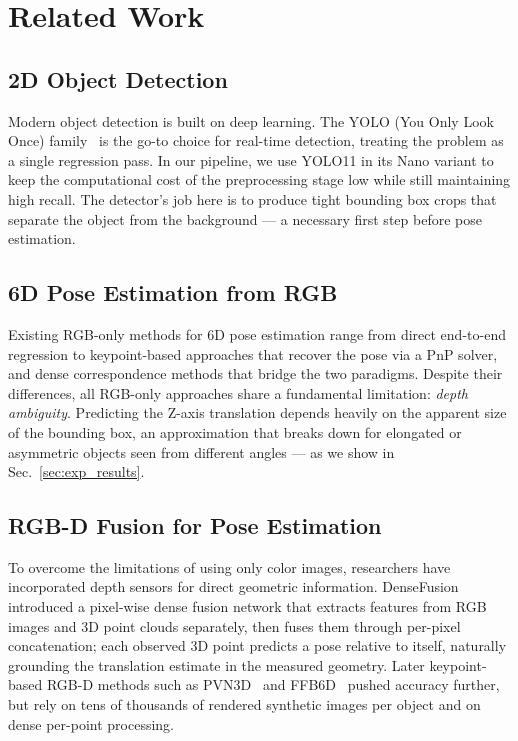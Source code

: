 \section{Related Work}
\label{sec:related}

\subsection{2D Object Detection}
\label{sec:related_detection}

Modern object detection is built on deep learning. The YOLO (You Only Look Once) family~\cite{ultralytics2024yolo11} is the go-to choice for real-time detection, treating the problem as a single regression pass. In our pipeline, we use YOLO11 in its Nano variant to keep the computational cost of the preprocessing stage low while still maintaining high recall. The detector's job here is to produce tight bounding box crops that separate the object from the background --- a necessary first step before pose estimation.

\subsection{6D Pose Estimation from RGB}
\label{sec:related_rgb_pose}

Existing RGB-only methods for 6D pose estimation range from direct end-to-end regression to keypoint-based approaches that recover the pose via a PnP solver, and dense correspondence methods that bridge the two paradigms. Despite their differences, all RGB-only approaches share a fundamental limitation: \emph{depth ambiguity}. Predicting the Z-axis translation depends heavily on the apparent size of the bounding box, an approximation that breaks down for elongated or asymmetric objects seen from different angles --- as we show in Sec.~\ref{sec:exp_results}.

\subsection{RGB-D Fusion for Pose Estimation}
\label{sec:related_rgbd}

To overcome the limitations of using only color images, researchers have incorporated depth sensors for direct geometric information. DenseFusion~\cite{wang2019densefusion} introduced a pixel-wise dense fusion network that extracts features from RGB images and 3D point clouds separately, then fuses them through per-pixel concatenation; each observed 3D point predicts a pose relative to itself, naturally grounding the translation estimate in the measured geometry. Later keypoint-based RGB-D methods such as PVN3D~\cite{he2020pvn3d} and FFB6D~\cite{he2021ffb6d} pushed accuracy further, but rely on tens of thousands of rendered synthetic images per object and on dense per-point processing.

